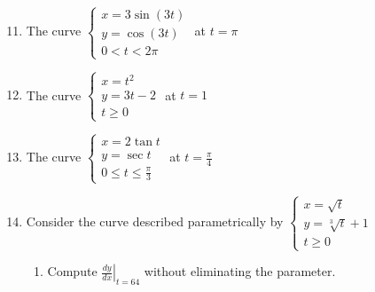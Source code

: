 \documentclass[12pt]{article}
\newif\ifans
\begin{document}

\begin{enumerate}
\setcounter{enumi}{10}

\item The curve $\left\{\begin{array}{l}
x=3\sin{(3t)}\\
y=\cos{(3t)}\\
0<t<2\pi\end{array}\right.$ at $t=\pi$ 

\ifans{\fbox{$\left.\frac{dy}{dx}\right|_{t=\pi}=0$; $\left.\frac{d^2y}{dx^2}\right|_{t=\pi}=\frac{1}{9}$}} \fi

\item The curve $\left\{\begin{array}{l}
x=t^2\\
y=3t-2\\
t \geq 0 \end{array}\right.$ at $t=1$ 

\ifans{\fbox{$\left.\frac{dy}{dx}\right|_{t=1}=\frac{3}{2}$; $\left.\frac{d^2y}{dx^2}\right|_{t=1}=-\frac{3}{4}$}} \fi

\item The curve $\left\{\begin{array}{l}
x=2\tan{t}\\
y=\sec{t}\\
0 \leq t \leq \frac{\pi}{3} \end{array}\right.$ at $t=\frac{\pi}{4}$ 

\ifans{\fbox{$\left.\frac{dy}{dx}\right|_{t=\pi/4}=\frac{\sqrt{2}}{4}$, $\left.\frac{d^2y}{dx^2}\right|_{t=\pi/4}=\frac{\sqrt{2}}{16}$; Detailed Solution: \textcolor{blue}{\href{http://www.math.drexel.edu/classes/Calculus/resources/Math122HW/Solutions/122_17_Parametric_13.pdf}{Here}}}} \fi

\item Consider the curve described parametrically by $\left\{\begin{array}{l}
x=\sqrt{t}\\
y=\sqrt[3]{t}+1\\
t \geq 0 \end{array}\right.$

\begin{enumerate}

\item Compute $\left.\frac{dy}{dx}\right|_{t=64}$ without eliminating the parameter.


\end{enumerate}
\end{enumerate}
\end{document}
